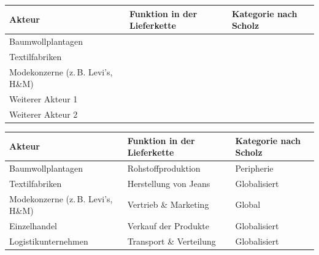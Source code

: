 \begin{myexercise}
    \begin{table}[H]
        \centering
        \small
        \begin{tabular}{p{4cm}||p{6cm}|p{4cm}}
            \textbf{Akteur}                   & \textbf{Funktion in der Lieferkette} & \textbf{Kategorie nach Scholz } \\
            \midrule\midrule
            Baumwollplantagen                 &                                      &                                 \\[1cm]\midrule
            Textilfabriken                    &                                      &                                 \\[1cm]\midrule
            Modekonzerne (z. B. Levi’s, H\&M) &                                      &                                 \\[1cm]\midrule
            Weiterer Akteur 1                 &                                      &                                 \\[1cm]\midrule
            Weiterer Akteur 2                 &                                      &                                 \\[1cm]
        \end{tabular}
    \end{table}
    \begin{myanswer}
        \begin{table}[H]
            \small
            \centering
            \begin{tabular}{p{4cm}||p{5cm}|p{3cm}}
                \textbf{Akteur}                     & \textbf{Funktion in der Lieferkette} & \textbf{Kategorie nach Scholz } \\
                \midrule\midrule
                Baumwollplantagen                   & Rohstoffproduktion                   & Peripherie                      \\\midrule
                Textilfabriken                      & Herstellung von Jeans                & Globalisiert                    \\\midrule
                Modekonzerne (z. B. Levi’s, H\&M)   & Vertrieb \& Marketing                & Global                          \\\midrule
                Einzelhandel                        & Verkauf der Produkte                 & Globalisiert                    \\\midrule
                Logistikunternehmen                 & Transport \& Verteilung              & Globalisiert                    \\\midrule

\end{tabular}
\end{table}
\end{myanswer}
\end{myexercise}
